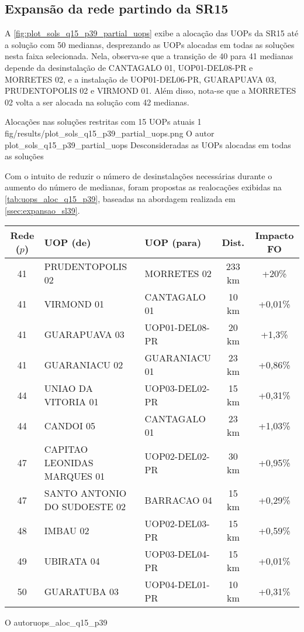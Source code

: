 
\subsection{Expansão da rede partindo da SR15}

A \autoref{fig:plot_sols_q15_p39_partial_uops} exibe a alocação das UOPs da SR15 até a solução com 50 medianas, desprezando as UOPs alocadas em todas as soluções nesta faixa selecionada. Nela, observa-se que a transição de 40 para 41 medianas depende da desinstalação de CANTAGALO 01, UOP01-DEL08-PR e MORRETES 02, e a instalação de UOP01-DEL06-PR, GUARAPUAVA 03, PRUDENTOPOLIS 02 e VIRMOND 01. Além disso, nota-se que a MORRETES 02 volta a ser alocada na solução com 42 medianas. 

\figurah
{Alocações nas soluções restritas com 15 UOPs atuais}
{1}
{fig/results/plot_sols_q15_p39_partial_uops.png}
{O autor}
{plot_sols_q15_p39_partial_uops}
{Desconsideradas as UOPs alocadas em todas as soluções}
{}

Com o intuito de reduzir o número de desinstalações necessárias durante o aumento do número de medianas, foram propostas as realocações exibidas na \autoref{tab:uops_aloc_q15_p39}, baseadas na abordagem realizada em \autoref{ssec:expansao_sl39}.

{\begin{tabular}{c|l|l|c|c}\hline
 Rede ($p$) & UOP (de) & UOP (para) & Dist. & Impacto FO \\ \hline\hline
 41 & PRUDENTOPOLIS 02 & MORRETES 02 & 233 km & +20\% \\
 41 & VIRMOND 01 & CANTAGALO 01 & 10 km & +0,01\% \\
 41 & GUARAPUAVA 03 & UOP01-DEL08-PR & 20 km & +1,3\% \\
 41 & GUARANIACU 02 & GUARANIACU 01 & 23 km & +0,86\% \\
 44 & UNIAO DA VITORIA 01 & UOP03-DEL02-PR & 15 km & +0,31\% \\
 44 & CANDOI 05 & CANTAGALO 01 & 23 km & +1,03\% \\
 47 & CAPITAO LEONIDAS MARQUES 01 & UOP02-DEL02-PR & 30 km & +0,95\% \\
 47 & SANTO ANTONIO DO SUDOESTE 02 & BARRACAO 04 & 15 km & +0,29\% \\
 48 & IMBAU 02 & UOP02-DEL03-PR & 15 km & +0,59\% \\
 49 & UBIRATA 04 & UOP03-DEL04-PR & 15 km & +0,01\% \\
 50 & GUARATUBA 03 & UOP04-DEL01-PR & 10 km & +0,31\% \\
 \hline
\end{tabular}}
{O autor}{uops_aloc_q15_p39}{}{}

